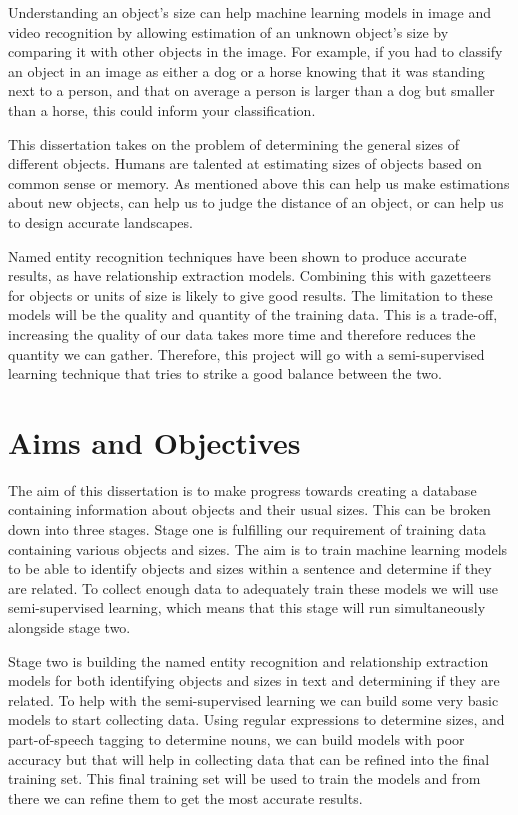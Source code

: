 \documentclass[11pt,oneside]{book}
\begin{document}
Understanding an object's size can help machine learning models in image and video recognition by allowing estimation of an unknown object's size by comparing it with other objects in the image. For example, if you had to classify an object in an image as either a dog or a horse knowing that it was standing next to a person, and that on average a person is larger than a dog but smaller than a horse, this could inform your classification.

This dissertation takes on the problem of determining the general sizes of different objects. Humans are talented at estimating sizes of objects based on common sense or memory. As mentioned above this can help us make estimations about new objects, can help us to judge the distance of an object, or can help us to design accurate landscapes.

Named entity recognition techniques have been shown to produce accurate results, as have relationship extraction models. Combining this with gazetteers for objects or units of size is likely to give good results. The limitation to these models will be the quality and quantity of the training data. This is a trade-off, increasing the quality of our data takes more time and therefore reduces the quantity we can gather. Therefore, this project will go with a semi-supervised learning technique that tries to strike a good balance between the two.

\section{Aims and Objectives}

The aim of this dissertation is to make progress towards creating a database containing information about objects and their usual sizes. This can be broken down into three stages. Stage one is fulfilling our requirement of training data containing various objects and sizes. The aim is to train machine learning models to be able to identify objects and sizes within a sentence and determine if they are related. To collect enough data to adequately train these models we will use semi-supervised learning, which means that this stage will run simultaneously alongside stage two.

Stage two is building the named entity recognition and relationship extraction models for both identifying objects and sizes in text and determining if they are related. To help with the semi-supervised learning we can build some very basic models to start collecting data. Using regular expressions to determine sizes, and part-of-speech tagging to determine nouns, we can build models with poor accuracy but that will help in collecting data that can be refined into the final training set. This final training set will be used to train the models and from there we can refine them to get the most accurate results.
\end{document}
